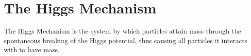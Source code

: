 \section{The Higgs Mechanism} \label{sec:theory:higgs}

The Higgs Mechanism is the system by which particles attain mass through the
spontaneous breaking of the Higgs potential, thus causing all particles it
interacts with to have mass.
